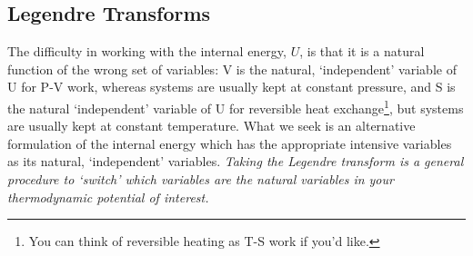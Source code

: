 \documentclass[12pt]{article}
\begin{document}


\subsection{Legendre Transforms} \label{LegendreTransforms}
The difficulty in working with the internal energy, $U$, is that it is a natural function of the wrong set of variables: V is the natural, `independent' variable of U for P-V work, whereas systems are usually kept at constant pressure, and S is the natural `independent' variable of U for reversible heat exchange\footnote{You can think of reversible heating as T-S work if you'd like.}, but systems are usually kept at constant temperature. What we seek is an alternative formulation of the internal energy which has the appropriate intensive variables as its natural, `independent' variables. \emph{Taking the Legendre transform is a general procedure to `switch' which variables are the natural variables in your thermodynamic potential of interest.}\\
\end{document}
